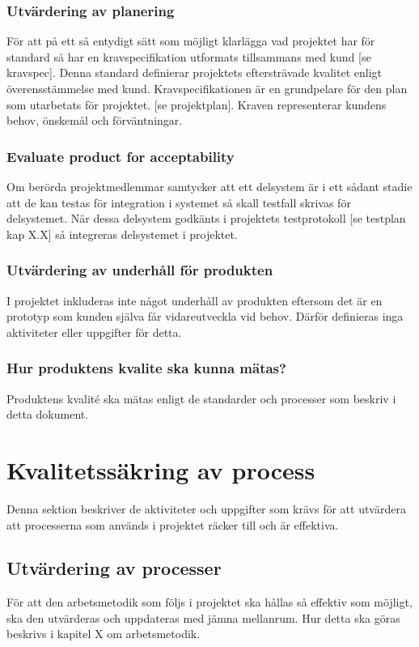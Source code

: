 \documentclass[a4paper,10pt]{article}
\begin{document}
\subsubsection{Utvärdering av planering}
För att på ett så entydigt sätt som möjligt klarlägga vad projektet har för standard så har en kravspecifikation utformats tillsammans med kund [se kravspec]. 
Denna standard definierar projektets eftersträvade kvalitet enligt överensstämmelse med kund.
Kravspecifikationen är en grundpelare för den plan som utarbetats för projektet. [se projektplan]. Kraven representerar kundens behov, önskemål och förväntningar. 
\subsubsection{Evaluate product for acceptability}
Om berörda projektmedlemmar samtycker att ett delsystem är i ett sådant stadie att de kan testas för integration i systemet så skall testfall skrivas för delsystemet. När dessa delsystem godkänts i projektets testprotokoll [se testplan kap X.X] så integreras delsystemet i projektet.
\subsubsection{Utvärdering av underhåll för produkten}
I projektet inkluderas inte något underhåll av produkten eftersom det är en prototyp som kunden själva får vidareutveckla vid behov. Därför definieras inga aktiviteter eller uppgifter för detta.
\subsubsection{Hur produktens kvalite ska kunna mätas?}
Produktens kvalité ska mätas enligt de standarder och processer som beskriv i detta dokument.
\section{Kvalitetssäkring av process}
\vspace{5mm}
Denna sektion beskriver de aktiviteter och uppgifter som krävs för att utvärdera att processerna som används i projektet räcker till och är effektiva.

\subsection{Utvärdering av processer}

För att den arbetsmetodik som följs i projektet ska hållas så effektiv som möjligt, ska den utvärderas och uppdateras med jämna mellanrum. Hur detta ska göras beskrivs i kapitel X om arbetsmetodik.
\end{document}
